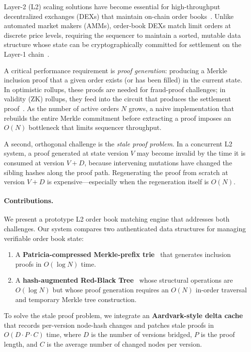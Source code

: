 \documentclass[letterpaper,twocolumn,10pt]{article}
\begin{document}
Layer-2 (L2) scaling solutions have become essential for high-throughput decentralized exchanges (DEXs) that maintain on-chain order books~\cite{buterin2021rollups, gudgeon2020sok}.
Unlike automated market makers (AMMs), order-book DEXs match limit orders at discrete price levels, requiring the sequencer to maintain a sorted, mutable data structure whose state can be cryptographically committed for settlement on the Layer-1 chain~\cite{starkware2020starkex, dydx2021}.

A critical performance requirement is \emph{proof generation}: producing a Merkle inclusion proof that a given order exists (or has been filled) in the current state.
In optimistic rollups, these proofs are needed for fraud-proof challenges; in validity (ZK) rollups, they feed into the circuit that produces the settlement proof~\cite{kalodner2018arbitrum}.
As the number of active orders $N$ grows, a naive implementation that rebuilds the entire Merkle commitment before extracting a proof imposes an $O(N)$ bottleneck that limits sequencer throughput.

A second, orthogonal challenge is the \emph{stale proof problem}.
In a concurrent L2 system, a proof generated at state version $V$ may become invalid by the time it is consumed at version $V + D$, because intervening mutations have changed the sibling hashes along the proof path.
Regenerating the proof from scratch at version $V + D$ is expensive---especially when the regeneration itself is $O(N)$.

\paragraph{Contributions.}
We present a prototype L2 order book matching engine that addresses both challenges.
Our system compares two authenticated data structures for managing verifiable order book state:
\begin{enumerate}
  \item A \textbf{Patricia-compressed Merkle-prefix trie}~\cite{morrison1968patricia, lighter2023} that generates inclusion proofs in $O(\log N)$ time.
  \item A \textbf{hash-augmented Red-Black Tree}~\cite{cormen2009introduction, bayer1972symmetric} whose structural operations are $O(\log N)$ but whose proof generation requires an $O(N)$ in-order traversal and temporary Merkle tree construction.
\end{enumerate}
To solve the stale proof problem, we integrate an \textbf{Aardvark-style delta cache}~\cite{aardvark2023} that records per-version node-hash changes and patches stale proofs in $O(D \cdot P \cdot C)$ time, where $D$ is the number of versions bridged, $P$ is the proof length, and $C$ is the average number of changed nodes per version.
\end{document}
